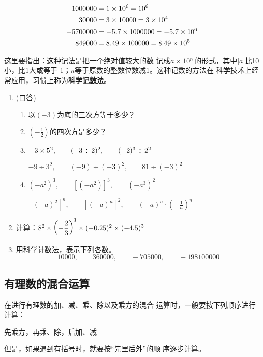 \begin{solution}
\[\begin{split}
    1000000 &=1\times 10^6=10^6\\ 
    30000  &=3\times 10000=3\times 10^4\\
    -5700000 &=-5.7\times 1000000=-5.7\times 10^6\\
     849000    &=8.49\times 100000=8.49\times 10^5
\end{split}\]
\end{solution}

这里要指出：这种记法是把一个绝对值较大的数
记成$a\times10^n$的形式，其中$|a|$比10小，比1大或等于
1；$n$等于原数的整数位数减1。这种记数的方法在
科学技术上经常应用，习惯上称为\textbf{科学记数法}。


\begin{ex}
\begin{enumerate}
    \item (口答)
     \begin{enumerate}
         \item 以$(- 3)$为底的三次方等于多少？
         \item $\left(-\frac{1}{2}\right)$的四次方是多少？
         \item $-3\times 5^2,\qquad (-3\div 2)^2,\qquad (-2)^3\div 2^2$
         
$-9\div 3^2,\qquad (-9)\div (-3)^2,\qquad 81\div (-3)^2$
 \item $(-a^2)^3,\qquad [(-a^2)]^3,\qquad (-a^3)^2$
 
 $[(-a)^2]^n,\qquad [(-a)^n]^2,\qquad (-a)^n\cdot \left(-\frac{1}{a}\right)^n$
      \end{enumerate}   
\item 计算：$8^2\times \left(-\dfrac{2}{3}\right)^3\times(-0.25)^2\times (-4.5)^3$
\item 用科学计数法，表示下列各数。
\[10000,\qquad 360000,\qquad -705000,\qquad -198100000  \]
\end{enumerate}
\end{ex}

\subsection{有理数的混合运算}
    在进行有理数的加、减、乘、除以及乘方的混合
运算时，一般要按下列顺序进行计算：
\begin{center}
  先乘方，再乘、除，后加、减  
\end{center}
但是，如果遇到有括号时，就要按“先里后外”的顺
序逐步计算。




